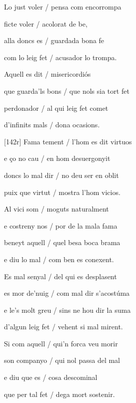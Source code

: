 \documentclass[12pt]{article}
\begin{document}
\begin{estrofa}

 Lo just voler / pensa com encorrompa

 ficte voler / acolorat de be,

 alla doncs es / guardada bona fe

 com lo leig fet / acusador lo trompa.

 Aquell es dit / misericordi\'{o}s

 que guarda'ls bons / que nols sia tort fet

 perdonador / al qui leig fet comet

 d'infinits mals / dona ocasions.

\end{estrofa}



\begin{estrofa}

 [142r] Fama tement / l'hom es dit virtuos

 e \c{c}o no cau / en hom desuergonyit

 doncs lo mal dir / no deu ser en oblit

 puix que virtut / mostra l'hom vicios.

 Al vici som / moguts naturalment

 e costreny nos / por de la mala fama

 beneyt aquell / quel besa boca brama

 e diu lo mal / com ben es conexent.

\end{estrofa}



\begin{estrofa}

 Es mal senyal / del qui es desplasent

 es mor de'nuig / com mal dir s'acost\'{u}ma

 e le's molt greu / sins ne hou dir la suma

 d'algun leig fet / vehent si mal mirent.

 Si com aquell / qui'n forca veu morir

 son companyo / qui nol passa del mal

 e diu que es / cosa descominal

 que per tal fet / dega mort sostenir.

\end{estrofa}
\end{document}
